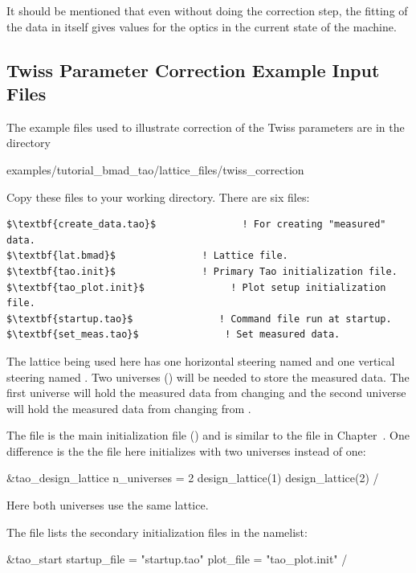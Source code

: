 \documentclass{hitec}     %
\begin{document}
{It should be mentioned that even without doing the correction step, the fitting of the data in 
itself gives values for the optics in the current state of the machine.

\subsection{Twiss Parameter Correction Example Input Files}
\label{s:twiss.setup}

The example files used to illustrate correction of the Twiss parameters are in the directory 
\begin{code}
examples/tutorial_bmad_tao/lattice_files/twiss_correction
\end{code}
Copy these files to your working directory. There are six files:
\begin{lstlisting}[mathescape]
$\textbf{create_data.tao}$               ! For creating "measured" data. 
$\textbf{lat.bmad}$               ! Lattice file.
$\textbf{tao.init}$               ! Primary Tao initialization file.
$\textbf{tao_plot.init}$               ! Plot setup initialization file.
$\textbf{startup.tao}$               ! Command file run at startup.
$\textbf{set_meas.tao}$               ! Set measured data.
\end{lstlisting}

The lattice being used here has one horizontal steering named  and one vertical steering
named . Two universes () will be needed to store the measured
data. The first universe will hold the measured data from changing  and the second universe
will hold the measured data from changing from .

The file  is the main initialization file () and is similar to the
 file in Chapter~. One difference is the the  file here
initializes \tao with two universes instead of one:
\begin{code}
&tao_design_lattice
  n_universes = 2
  design_lattice(1)%
  design_lattice(2)%
/
\end{code}
Here both universes use the same lattice.

The  file lists the secondary initialization files in the  namelist:
\begin{code}
&tao_start
  startup_file = "startup.tao"
  plot_file = "tao_plot.init"
/
\end{code}

}
\end{document}
